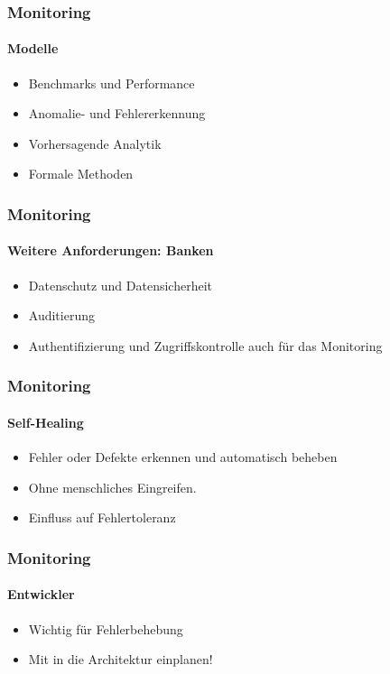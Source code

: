 \begin{frame}
  \frametitle{Monitoring}
  \framesubtitle{Modelle}
  \begin{itemize}
    \item Benchmarks und Performance
    \item Anomalie- und Fehlererkennung
    \item Vorhersagende Analytik
    \item Formale Methoden
  \end{itemize}
\end{frame}

\begin{frame}
  \frametitle{Monitoring}
  \framesubtitle{Weitere Anforderungen: Banken}
  \begin{itemize}
    \item Datenschutz und Datensicherheit
    \item Auditierung
    \item Authentifizierung und Zugriffskontrolle auch für das Monitoring
  \end{itemize}
\end{frame}

\begin{frame}
  \frametitle{Monitoring}
  \framesubtitle{Self-Healing}
  \begin{itemize}
    \item Fehler oder Defekte erkennen und automatisch beheben
    \item Ohne menschliches Eingreifen.
    \item Einfluss auf Fehlertoleranz
  \end{itemize}
\end{frame}

\begin{frame}
  \frametitle{Monitoring}
  \framesubtitle{Entwickler}
  \begin{itemize}
    \item Wichtig für Fehlerbehebung
    \item Mit in die Architektur einplanen!
  \end{itemize}
\end{frame}
